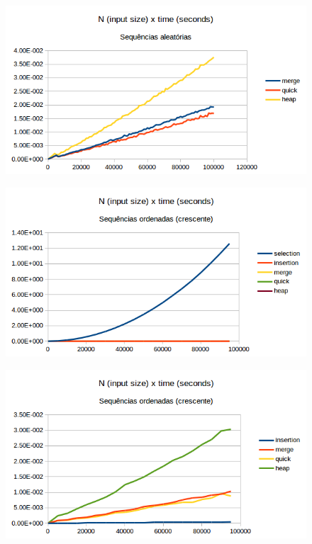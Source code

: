 \documentclass[11pt,a4paper]{article}
\begin{document}
\begin{figure}[]
  \begin{center}
      \includegraphics[width=1\textwidth]{random_nlogn}
  \end{center}
      \label{fig:b}
\end{figure}

\begin{figure}[]
  \begin{center}
      \includegraphics[width=1\textwidth]{sorted_up}
  \end{center}
      \label{fig:c}
\end{figure}

\begin{figure}[]
  \begin{center}
      \includegraphics[width=1\textwidth]{sorted_up_zoom}
  \end{center}
      \label{fig:d}
\end{figure}
\end{document}
